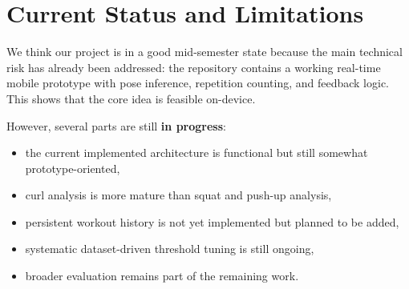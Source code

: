 \documentclass[12pt,a4paper]{article}
\begin{document}
\section{Current Status and Limitations}

We think our project is in a good mid-semester state because the main technical risk has already been addressed: the repository contains a working real-time mobile prototype with pose inference, repetition counting, and feedback logic. This shows that the core idea is feasible on-device.

However, several parts are still \textbf{in progress}:

\begin{itemize}
    \item the current implemented architecture is functional but still somewhat prototype-oriented,
    \item curl analysis is more mature than squat and push-up analysis,
    \item persistent workout history is not yet implemented but planned to be added,
    \item systematic dataset-driven threshold tuning is still ongoing,
    \item broader evaluation remains part of the remaining work.
\end{itemize}
\end{document}
